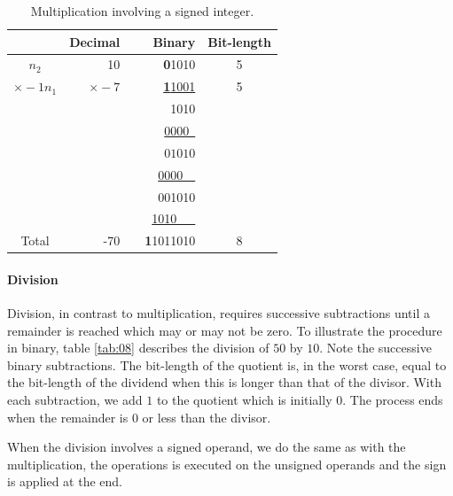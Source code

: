 \documentclass[12pt]{article}
\begin{document}
\begin{table}[ht]
	\centering
    \caption{Multiplication involving a signed integer.}
    \begin{tabular}{crrrc}
    \hline
    	  & Decimal & & Binary & Bit-length \\
    \hline      
    $n_2$ & 10	& & \textbf{0}1010 & 5 \\
    $\times -1n_1$ & \underline{$\times -7$} & & \underline{\textbf{1}1001} & 5
\\
    & & & 1010  & \\
    & & & \underline{0000\ } & \\
    & & & $01010$ & \\
    & & & \underline{0000\ \ } & \\
    & & & 001010 & \\
    & & & \underline{1010\ \ \ } & \\
    Total& -70 & & \textbf{1}1011010 & 8\\
    \hline
	\end{tabular}
    \label{tab:07}
\end{table}

\paragraph{Division}
Division, in contrast to multiplication, requires successive subtractions until
a remainder is reached which may or may not be zero. To illustrate the
procedure in binary, table \ref{tab:08} describes the division of $50$ by $10$.
Note the successive binary subtractions. The bit-length of the quotient is, in
the worst case, equal to the bit-length of the dividend when this is longer
than that of the divisor. With each subtraction, we add $1$ to the quotient
which is initially $0$. The process ends when the remainder is $0$ or less than
the divisor.

When the division involves a signed operand, we do the same as with the
multiplication, the operations is executed on the unsigned operands and the
sign is applied at the end.
\end{document}
